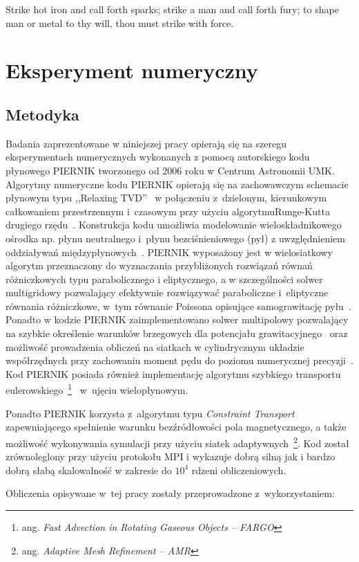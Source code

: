 \begin{savequote}[75mm]
Strike hot iron and call forth sparks; strike a man and call forth fury; to shape man or metal to thy will, thou must
strike with force.
\end{savequote}

\chapter{Eksperyment numeryczny}
\section{Metodyka}
\label{sec:metodyka}
Badania zaprezentowane w niniejszej pracy opierają się na szeregu eksperymentach
numerycznych wykonanych z pomocą autorskiego kodu płynowego PIERNIK tworzonego
od 2006 roku w Centrum Astronomii UMK.  Algorytmy numeryczne kodu PIERNIK
opierają się na zachowawczym schemacie płynowym typu ,,Relaxing
TVD''~\cite{jin-xin-95} w połączeniu z~dzielonym, kierunkowym całkowaniem
przestrzennym i~czasowym przy użyciu algorytmu\linebreak Runge-Kutta drugiego
rzędu~\cite{2003PASP..115..303T,2003ApJS..149..447P}. Konstrukcja kodu umożliwia
modelowanie wieloskładnikowego ośrodka np. płynu neutralnego i~płynu
bezciśnieniowego (pył) z uwzględnieniem oddziaływań
międzypłynowych~\cite{piernik1,piernik2}. PIERNIK wyposażony jest w
wielosiatkowy algorytm przeznaczony do wyznaczania przybliżonych rozwiązań
równań różniczkowych typu parabolicznego i eliptycznego, a w szczególności
solwer multigridowy pozwalający efektywnie rozwiązywać paraboliczne
i~eli\-pty\-czne równania różniczkowe, w~tym równanie Poissona opisujące
samograwitację pyłu~\citep{HG00}. Ponadto w kodzie PIERNIK zaimplementowano
solwer multipolowy pozwalający na szybkie określenie warunków brzegowych dla
potencjału grawitacyjnego~\citep{J77} oraz możliwość prowadzenia obliczeń na
siatkach w cylindrycznym układzie współrzędnych przy zachowaniu moment pędu do
poziomu numerycznej precyzji~\cite{M07,SO10}. Kod PIERNIK posiada również
implementację algorytmu szybkiego transportu eulerowskiego~\footnote{ang.
\emph{Fast Advection in Rotating Gaseous Objects -- FARGO}}~\citep{M00} w~ujęciu
wielopłynowym.
\par 
Ponadto PIERNIK korzysta z~algorytmu typu \emph{Constraint
Transport}~\cite{EH88} zapewniającego spełnienie warunku bezźródłowości pola
magnetycznego, a także możliwość wykonywania symulacji przy użyciu siatek
adaptywnych~\footnote{ang.  \emph{Adaptive Mesh Refinement -- AMR}}. Kod został
zrównoleglony przy użyciu protokołu MPI i wykazuje dobrą silną jak i bardzo
dobrą słabą skalowalność w zakresie do $10^4$ rdzeni obliczeniowych.
%
\par Obliczenia opisywane w~tej pracy zostały przeprowadzone z~wykorzystaniem:

